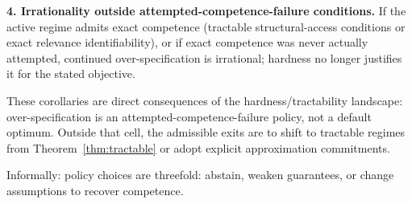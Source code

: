 \textbf{4. Irrationality outside attempted-competence-failure conditions.} If the active regime admits exact competence (tractable structural-access conditions or exact relevance identifiability), or if exact competence was never actually attempted, continued over-specification is irrational; hardness no longer justifies it for the stated objective.

These corollaries are direct consequences of the hardness/tractability landscape: over-specification is an attempted-competence-failure policy, not a default optimum. Outside that cell, the admissible exits are to shift to tractable regimes from Theorem~\ref{thm:tractable} or adopt explicit approximation commitments.

Informally: policy choices are threefold: abstain, weaken guarantees, or change assumptions to recover competence.
